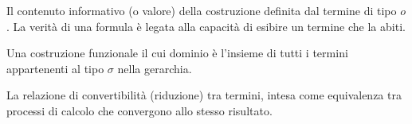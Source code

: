 \begin{description}[leftmargin=3.5em, style=nextline, font=\bfseries]
    \item[Termini $M^o$] 
        Il contenuto informativo (o valore) della costruzione definita dal termine di tipo $o$. 
        La verità di una formula è legata alla capacità di esibire un termine che la abiti.
    \item[$\forall x^\sigma \Phi$] 
        Una costruzione funzionale il cui dominio è l'insieme di tutti i termini appartenenti 
        al tipo $\sigma$ nella gerarchia.
    \item[Identità] 
        La relazione di convertibilità (riduzione) tra termini, intesa come equivalenza tra processi 
        di calcolo che convergono allo stesso risultato.
\end{description}